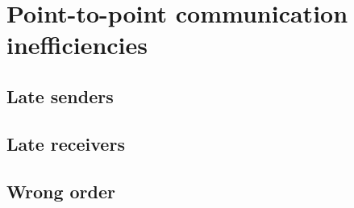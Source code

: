 \section{Point-to-point communication inefficiencies}
\label{section:distributed-memory:point-to-point}

\subsection{Late senders}

\subsection{Late receivers}

\subsection{Wrong order}
